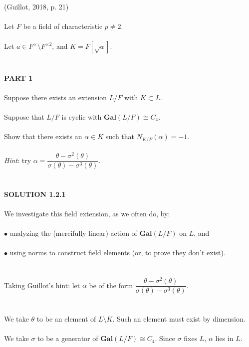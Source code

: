 \documentclass{article}
\begin{document}
 \indent (Guillot, 2018, p. 21) \\\\
\indent Let $F$ be a field of characteristic $p \neq 2$. \\\\
\indent Let $a \in F^\times{\setminus}F^{\times2}$, and $K = F[\sqrt{a}]$. \\\\
\\
\textbf{PART 1} \\\\
\indent Suppose there exists an extension $L/F$ with $K \subset L$. \\\\
\indent Suppose that $L/F$ is cyclic with $\textbf{Gal}(L/F) \cong C_4$. \\\\
\indent Show that there exists an $\alpha \in K$ such that $N_{K/F}(\alpha) = -1$. \\\\
\indent \emph{Hint}: try $\alpha = \dfrac{\theta - \sigma^2(\theta)}{\sigma(\theta) - \sigma^3(\theta)}$. \\\\
\\
\textbf{SOLUTION 1.2.1} \\\\
We investigate this field extension, as we often do, by: \\\\
\indent $\bullet$ \indent analyzing the (mercifully linear) action of $\textbf{Gal}(L/F)$ on $L$, and \\\\
\indent $\bullet$ \indent using norms to construct field elements (or, to prove they don't exist). \\\\\\
Taking Guillot's hint: let $\alpha$ be of the form $\dfrac{\theta - \sigma^2(\theta)}{\sigma(\theta) - \sigma^3(\theta)}$. \\\\\\
We take $\theta$ to be an element of $L\setminus K$. Such an element must exist by dimension. \\\\
We take $\sigma$ to be a generator of $\textbf{Gal}(L/F) \cong C_4$. Since $\sigma$ fixes $L$, $\alpha$ lies in $L$. \\\\
\end{document}
